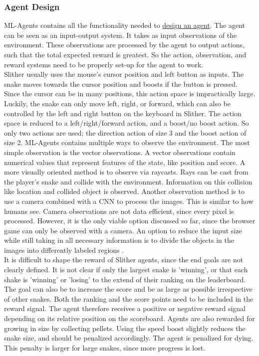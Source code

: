 \subsubsection{Agent Design}
ML-Agents contains all the functionality needed to \href{https://github.com/Unity-Technologies/ml-agents/blob/main/docs/Learning-Environment-Design-Agents.md}{design an agent}. The agent can be seen as an input-output system. It takes as input observations of the environment. These observations are processed by the agent to output actions, such that the total expected reward is greatest. So the action, observation, and reward systems need to be properly set-up for the agent to work.
\\[2.5mm]
Slither usually uses the mouse's cursor position and left button as inputs. The snake moves towards the cursor position and boosts if the button is pressed. Since the cursor can be in many positions, this action space is impractically large. Luckily, the snake can only move left, right, or forward, which can also be controlled by the left and right button on the keyboard in Slither. The action space is reduced to a left/right/forward action, and a boost/no boost action. So only two actions are used; the direction action of size 3 and the boost action of size 2.
\newpage \noindent
ML-Agents contains multiple ways to observe the environment. The most simple observation is the vector observations. A vector observations contain numerical values that represent features of the state, like position and score. A more visually oriented method is to observe via raycasts. Rays can be cast from the player's snake and collide with the environment. Information on this collision like location and collided object is observed. Another observation method is to use a camera combined with a CNN to process the images. This is similar to how humans see. Camera observations are not data efficient, since every pixel is processed. However, it is the only viable option discussed so far, since the browser game can only be observed with a camera. An option to reduce the input size while still taking in all necessary information is to divide the objects in the images into differently labeled regions \cite{prev:Slihter_2017_OpenCV}. 
\\[2.5mm]
It is difficult to shape the reward of Slither agents, since the end goals are not clearly defined. It is not clear if only the largest snake is 'winning', or that each shake is 'winning' or 'losing' to the extend of their ranking on the leaderboard. The goal can also be to increase the score and be as large as possible irrespective of other snakes. Both the ranking and the score points need to be included in the reward signal. The agent therefore receives a positive or negative reward signal depending on its relative position on the scoreboard. Agents are also rewarded for growing in size by collecting pellets. Using the speed boost slightly reduces the snake size, and should be penalized accordingly. The agent is penalized for dying. This penalty is larger for large snakes, since more progress is lost. 




